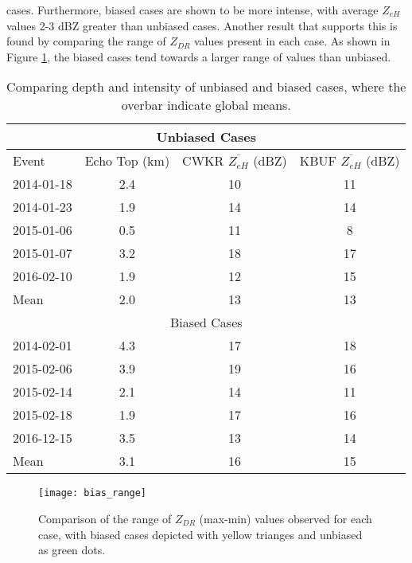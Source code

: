  cases. Furthermore, biased cases are shown to be more intense, with average $Z_{eH}$ values 2-3 dBZ greater 
 than unbiased cases. 
Another result that supports this is found by comparing the range of $Z_{DR}$ values present in each case. As 
shown in Figure \ref{fig:bias_range}, the biased cases tend towards a larger range of values than unbiased. 
\begin{table}[H]
    \caption{Comparing depth and intensity of unbiased and biased cases, where the overbar indicate global means.}\label{diagnosebias}
    \begin{center}
    \begin{tabular}{|l|c|c|c|}
    \hline
    \multicolumn{4}{|c|}{Unbiased Cases} \\
    \hline
     Event & Echo Top (km) & CWKR $\overline{Z_{eH}}$ (dBZ) & KBUF $\overline{Z_{eH}}$ (dBZ)\\
    \hline\hline
    2014-01-18 & 2.4 & 10 & 11 \\
    \hline
    2014-01-23 & 1.9 & 14 & 14 \\
    \hline
    2015-01-06 & 0.5 & 11 & 8 \\
    \hline
    2015-01-07 & 3.2 & 18 & 17 \\ 
    \hline
    2016-02-10 & 1.9 & 12 & 15 \\ 
    \hline\hline
    Mean & 2.0 & 13 & 13\\
    \hline
    \multicolumn{4}{|c|}{Biased Cases} \\
    \hline\hline
    2014-02-01 & 4.3 & 17 & 18\\
    \hline
    2015-02-06 & 3.9 & 19 & 16\\
    \hline
    2015-02-14 & 2.1 & 14 & 11\\
    \hline
    2015-02-18 & 1.9 & 17 & 16\\ 
    \hline
    2016-12-15 & 3.5 & 13 & 14  \\ 
    \hline\hline
    Mean & 3.1 & 16 & 15 \\
    \hline
    \end{tabular}
    \end{center}
\end{table}


\begin{figure}[H]
\centering
\texttt{[image: bias\_range]}
\caption{Comparison of the range of $Z_{DR}$ (max-min) values observed for each case, with biased cases depicted with yellow trianges and unbiased as green dots.} 
\label{fig:bias_range}
\end{figure}
